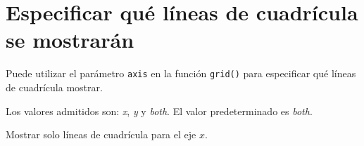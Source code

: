 \section{Especificar qué líneas de cuadrícula se mostrarán}

Puede utilizar el parámetro \texttt{axis} en la función \texttt{grid()}
para especificar qué líneas de cuadrícula mostrar.

Los valores admitidos son: \emph{\textquotesingle x\textquotesingle{}},
\emph{\textquotesingle y\textquotesingle{}} y
\emph{\textquotesingle both\textquotesingle{}}. El valor predeterminado
es \emph{\textquotesingle both\textquotesingle{}}.

\begin{code} Mostrar solo líneas de cuadrícula para el eje \(x\).

\begin{Shaded}
\begin{Highlighting}[]

\OperatorTok{=}\NormalTok{ np.array([}\NormalTok{, }\NormalTok{, }\NormalTok{, }\NormalTok{, }\NormalTok{, }\NormalTok{, }\NormalTok{, }\NormalTok{, }\NormalTok{, }\NormalTok{])}
\OperatorTok{=}\NormalTok{ np.array([}\NormalTok{, }\NormalTok{, }\NormalTok{, }\NormalTok{, }\NormalTok{, }\NormalTok{, }\NormalTok{, }\NormalTok{, }\NormalTok{, }\NormalTok{])}

\NormalTok{)}
\NormalTok{)}
\NormalTok{)}

\OperatorTok{=} \NormalTok{)}
\end{Highlighting}
\end{Shaded}


\end{code}
